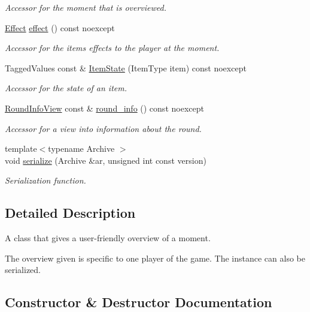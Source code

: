 \begin{DoxyCompactItemize}
\begin{DoxyCompactList}\small\item\em Accessor for the moment that is overviewed. \end{DoxyCompactList}\item 
\hyperlink{classitem_1_1_effect}{Effect} \hyperlink{classexternal_1_1_moment_overview_abeb27fa11c351eea2c90679842895497}{effect} () const noexcept
\begin{DoxyCompactList}\small\item\em Accessor for the items\textquotesingle{} effects to the player at the moment. \end{DoxyCompactList}\item 
Tagged\+Values const  \& \hyperlink{classexternal_1_1_moment_overview_a0be90c4fbf03a2db4bfaa8a1ba2c7674}{Item\+State} (Item\+Type item) const noexcept
\begin{DoxyCompactList}\small\item\em Accessor for the state of an item. \end{DoxyCompactList}\item 
\hyperlink{classroundinfo_1_1_round_info_view}{Round\+Info\+View} const  \& \hyperlink{classexternal_1_1_moment_overview_a186a205fd74b30b627b82bf837b78f79}{round\+\_\+info} () const noexcept
\begin{DoxyCompactList}\small\item\em Accessor for a view into information about the round. \end{DoxyCompactList}\item 
{\footnotesize template$<$typename Archive $>$ }\\void \hyperlink{classexternal_1_1_moment_overview_a5791e663d0c7be6c1a19b0b7af416855}{serialize} (Archive \&ar, unsigned int const version)
\begin{DoxyCompactList}\small\item\em Serialization function. \end{DoxyCompactList}\end{DoxyCompactItemize}


\subsection{Detailed Description}
A class that gives a user-\/friendly overview of a moment. 

The overview given is specific to one player of the game. The instance can also be serialized. 

\subsection{Constructor \& Destructor Documentation}
\mbox{\label{classexternal_1_1_moment_overview_aabe55b10c977be45ba2574c606676c87}} 
